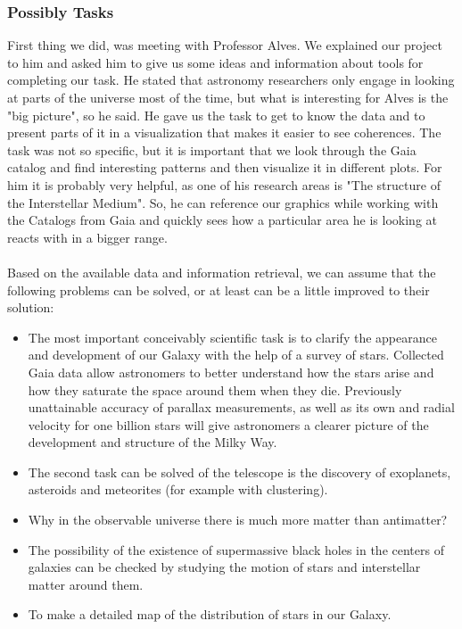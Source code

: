 \documentclass{article}
\begin{document}
\subsubsection {Possibly Tasks}
First thing we did, was meeting with Professor Alves. We explained our project to him and asked him to give us some ideas and information about tools for completing our task. He stated that astronomy researchers only engage in looking at parts of the universe most of the time, but what is interesting for Alves is the "big picture", so he said. He gave us the task to get to know the data and to present parts of it in a visualization that makes it easier to see coherences. The task was not so specific, but it is important that we look through the Gaia catalog and find interesting patterns and then visualize it in different plots. For him it is probably very helpful, as one of his research areas is "The structure of the Interstellar Medium". So, he can reference our graphics while working with the Catalogs from Gaia and quickly sees how a particular area he is looking at reacts with in a bigger range.
\\ \\
Based on the available data and information retrieval, we can assume that the following problems can be solved, or at least can be a little improved to their solution:
\begin{itemize}
\item The most important conceivably scientific task is to clarify the appearance and development of our Galaxy with the help of a survey of stars. Collected Gaia data allow astronomers to better understand how the stars arise and how they saturate the space around them when they die. Previously unattainable accuracy of parallax measurements, as well as its own and radial velocity for one billion stars will give astronomers a clearer picture of the development and structure of the Milky Way.
\item The second task can be solved of the telescope is the discovery of exoplanets, asteroids and meteorites (for example with clustering). 
\item Why in the observable universe there is much more matter than antimatter?
\item The possibility of the existence of supermassive black holes in the centers of galaxies can be checked by studying the motion of stars and interstellar matter around them. 
\item To make a detailed map of the distribution of stars in our Galaxy.
\end{itemize}
\end{document}
